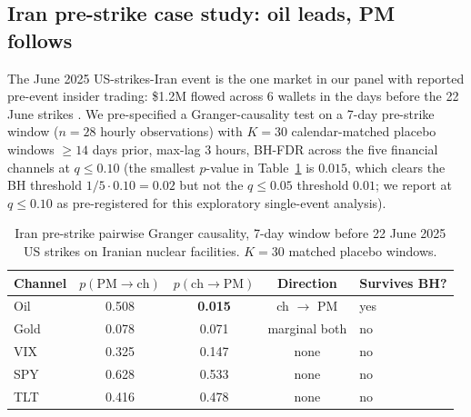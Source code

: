 \documentclass{article}
\begin{document}
\subsection{Iran pre-strike case study: oil leads, PM follows}
\label{sec:iran}

The June 2025 US-strikes-Iran event is the one market in our panel with reported pre-event insider trading: \$1.2M flowed across 6 wallets in the days before the 22 June strikes \citep{chainalysis2025iran}. We pre-specified a Granger-causality test on a 7-day pre-strike window ($n = 28$ hourly observations) with $K = 30$ calendar-matched placebo windows $\ge 14$ days prior, max-lag 3 hours, BH-FDR \citep{benjamini1995controlling} across the five financial channels at $q \le 0.10$ (the smallest $p$-value in Table~\ref{tab:iran} is $0.015$, which clears the BH threshold $1/5 \cdot 0.10 = 0.02$ but not the $q \le 0.05$ threshold $0.01$; we report at $q \le 0.10$ as pre-registered for this exploratory single-event analysis).

\begin{table}[h]
\centering
\caption{Iran pre-strike pairwise Granger causality, 7-day window before 22 June 2025 US strikes on Iranian nuclear facilities. $K = 30$ matched placebo windows.}
\label{tab:iran}
\small
\begin{tabular}{lcccl}
\toprule
Channel & $p(\text{PM} \to \text{ch})$ & $p(\text{ch} \to \text{PM})$ & Direction & Survives BH? \\
\midrule
Oil  & 0.508 & \textbf{0.015} & ch $\to$ PM & yes \\
Gold & 0.078 & 0.071 & marginal both & no \\
VIX  & 0.325 & 0.147 & none & no \\
SPY  & 0.628 & 0.533 & none & no \\
TLT  & 0.416 & 0.478 & none & no \\
\bottomrule
\end{tabular}
\end{table}
\end{document}
